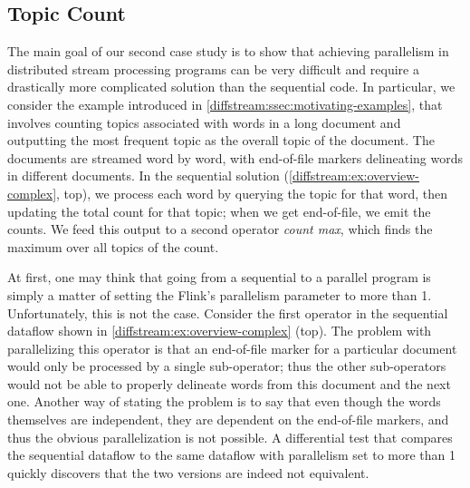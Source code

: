 \subsection{Topic Count}
\label{diffstream:ssec:evaluation-wordcount}

The main goal of our second case study is to show that achieving parallelism in distributed stream processing programs can be very difficult and require a drastically more complicated solution than the sequential code.
In particular, we consider the example introduced
in \cref{diffstream:ssec:motivating-examples}, that involves counting topics associated with words in a long document
and outputting the most frequent topic as the overall topic of the document.
The documents are streamed word by word, with end-of-file markers
delineating words in different documents.
In the sequential solution (\cref{diffstream:ex:overview-complex}, top), we process each word by querying the topic for that word, then updating the total count for that topic; when we get end-of-file, we emit the counts. We feed this output to a second operator \emph{count max}, which finds the maximum over all topics of the count.

At first, one may think that going from a sequential to a parallel program is
simply a matter of setting the Flink's parallelism parameter to more than 1.
Unfortunately, this is not the case. Consider the first operator in the
sequential dataflow shown in \cref{diffstream:ex:overview-complex} (top). The problem with
parallelizing this operator is that an end-of-file marker for a particular
document would only be processed by a single sub-operator; thus the other
sub-operators would not be able to properly delineate words from this document
and the next one. Another way of stating the problem is to say that even
though the words themselves are independent, they are dependent on the
end-of-file markers, and thus the obvious parallelization is not possible.
A differential test that compares the sequential dataflow
to the same dataflow with parallelism set to more than 1
quickly discovers that the two versions are indeed not equivalent.

